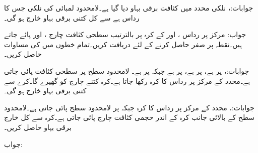 جوابات:، 
نلکی محدد میں کثافت برقی بہاو  دیا گیا ہے۔لامحدود لمبائی کی نلکی جس کا رداس  ہے سے کل کتنی برقی بہاو خارج ہو گی۔

جواب:
مرکز پر رداس ،  اور  کے کرہ پر بالترتیب سطحی کثافت چارج ، 
 اور  پائے جاتے ہیں۔نقطہ  پر صفر  حاصل کرنے کے لئے  دریافت کریں۔تمام خطوں میں  کی مساوات حاصل کریں۔  

جوابات:،  پر  ہے،  پر  ہے، پر  ہے جبکہ  پر  ہے۔
لامحدود سطح  پر  سطحی کثافت پائی جاتی ہے۔محدد کے مرکز پر  رداس کا کرہ رکھا جاتا ہے۔کرہ کتنے چارج کو گھیرے گا۔کرے سے کتنی برقی بہاو خارج ہو گی۔

جوابات:، 
محدد کے مرکز پر  رداس کا کرہ جبکہ  پر لامحدود سطح پائی جاتی ہے۔لامحدود سطح کے بالائی جانب کرہ کے اندر  حجمی کثافت
 چارج  پائی جاتی ہے۔کرہ سے کل خارج برقی بہاو حاصل کریں۔

جواب: 
